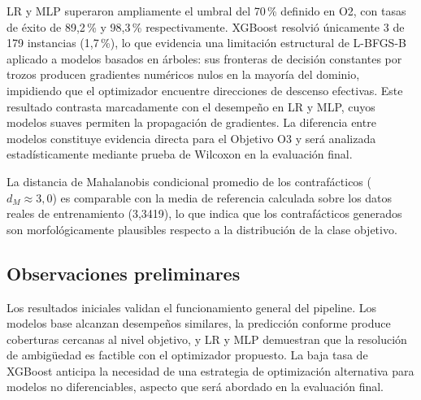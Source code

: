 \documentclass[conference]{IEEEtran}
\begin{document}
LR y MLP superaron ampliamente el umbral del 70\,\% definido en O2, con
tasas de éxito de 89{,}2\,\% y 98{,}3\,\% respectivamente. XGBoost
resolvió únicamente 3 de 179 instancias (1{,}7\,\%), lo que evidencia
una limitación estructural de L-BFGS-B aplicado a modelos basados en
árboles: sus fronteras de decisión constantes por trozos producen
gradientes numéricos nulos en la mayoría del dominio, impidiendo que el
optimizador encuentre direcciones de descenso efectivas. Este resultado
contrasta marcadamente con el desempeño en LR y MLP, cuyos modelos
suaves permiten la propagación de gradientes. La diferencia entre modelos
constituye evidencia directa para el Objetivo O3 y será analizada
estadísticamente mediante prueba de Wilcoxon en la evaluación final.

La distancia de Mahalanobis condicional promedio de los contrafácticos
($d_M \approx 3{,}0$) es comparable con la media de referencia calculada
sobre los datos reales de entrenamiento (3{,}3419), lo que indica que
los contrafácticos generados son morfológicamente plausibles respecto a
la distribución de la clase objetivo.

\subsection{Observaciones preliminares}

Los resultados iniciales validan el funcionamiento general del pipeline.
Los modelos base alcanzan desempeños similares, la predicción conforme
produce coberturas cercanas al nivel objetivo, y LR y MLP demuestran
que la resolución de ambigüedad es factible con el optimizador propuesto.
La baja tasa de XGBoost anticipa la necesidad de una estrategia de
optimización alternativa para modelos no diferenciables, aspecto que
será abordado en la evaluación final.
\end{document}
